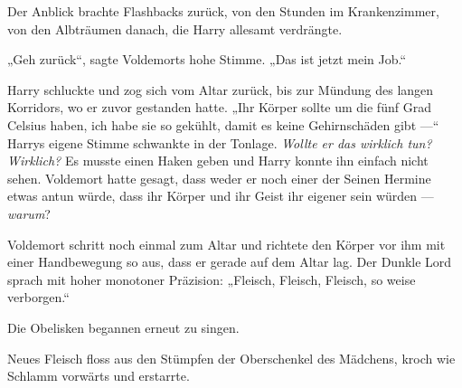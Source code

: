 Der Anblick brachte Flashbacks zurück, von den Stunden im Krankenzimmer, von den Albträumen danach, die Harry allesamt verdrängte.

„Geh zurück“, sagte Voldemorts hohe Stimme.
„Das ist jetzt mein Job.“

Harry schluckte und zog sich vom Altar zurück, bis zur Mündung des langen Korridors, wo er zuvor gestanden hatte.
„Ihr Körper sollte um die fünf Grad Celsius haben, ich habe sie so gekühlt, damit es keine Gehirnschäden gibt —“ Harrys eigene Stimme schwankte in der Tonlage.
\emph{Wollte er das wirklich tun? Wirklich?}
Es musste einen Haken geben und Harry konnte ihn einfach nicht sehen. Voldemort hatte gesagt, dass weder er noch einer der Seinen Hermine etwas antun würde, dass ihr Körper und ihr Geist ihr eigener sein würden — \emph{warum}?

Voldemort schritt noch einmal zum Altar und richtete den Körper vor ihm mit einer Handbewegung so aus, dass er gerade auf dem Altar lag. Der Dunkle Lord sprach mit hoher monotoner Präzision:
„Fleisch, Fleisch, Fleisch, so weise verborgen.“

Die Obelisken begannen erneut zu singen.



Neues Fleisch floss aus den Stümpfen der Oberschenkel des Mädchens, kroch wie Schlamm vorwärts und erstarrte.

